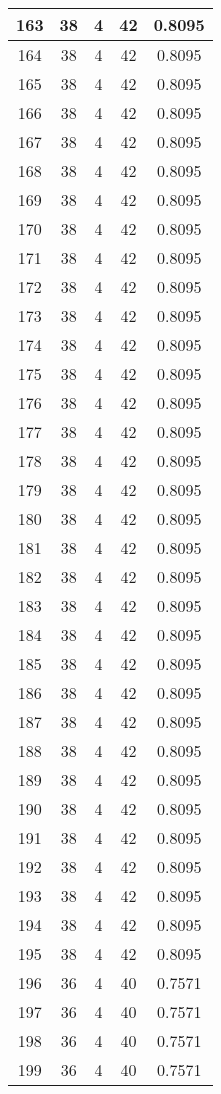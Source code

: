\documentclass[letterpaper, 12pt]{article}
\begin{document}
\begin{longtable}{|c|c|c|c|c|}
\hline
163 & 38 & 4 & 42 & 0.8095 \\
\hline
164 & 38 & 4 & 42 & 0.8095 \\
\hline
165 & 38 & 4 & 42 & 0.8095 \\
\hline
166 & 38 & 4 & 42 & 0.8095 \\
\hline
167 & 38 & 4 & 42 & 0.8095 \\
\hline
168 & 38 & 4 & 42 & 0.8095 \\
\hline
169 & 38 & 4 & 42 & 0.8095 \\
\hline
170 & 38 & 4 & 42 & 0.8095 \\
\hline
171 & 38 & 4 & 42 & 0.8095 \\
\hline
172 & 38 & 4 & 42 & 0.8095 \\
\hline
173 & 38 & 4 & 42 & 0.8095 \\
\hline
174 & 38 & 4 & 42 & 0.8095 \\
\hline
175 & 38 & 4 & 42 & 0.8095 \\
\hline
176 & 38 & 4 & 42 & 0.8095 \\
\hline
177 & 38 & 4 & 42 & 0.8095 \\
\hline
178 & 38 & 4 & 42 & 0.8095 \\
\hline
179 & 38 & 4 & 42 & 0.8095 \\
\hline
180 & 38 & 4 & 42 & 0.8095 \\
\hline
181 & 38 & 4 & 42 & 0.8095 \\
\hline
182 & 38 & 4 & 42 & 0.8095 \\
\hline
183 & 38 & 4 & 42 & 0.8095 \\
\hline
184 & 38 & 4 & 42 & 0.8095 \\
\hline
185 & 38 & 4 & 42 & 0.8095 \\
\hline
186 & 38 & 4 & 42 & 0.8095 \\
\hline
187 & 38 & 4 & 42 & 0.8095 \\
\hline
188 & 38 & 4 & 42 & 0.8095 \\
\hline
189 & 38 & 4 & 42 & 0.8095 \\
\hline
190 & 38 & 4 & 42 & 0.8095 \\
\hline
191 & 38 & 4 & 42 & 0.8095 \\
\hline
192 & 38 & 4 & 42 & 0.8095 \\
\hline
193 & 38 & 4 & 42 & 0.8095 \\
\hline
194 & 38 & 4 & 42 & 0.8095 \\
\hline
195 & 38 & 4 & 42 & 0.8095 \\
\hline
196 & 36 & 4 & 40 & 0.7571 \\
\hline
197 & 36 & 4 & 40 & 0.7571 \\
\hline
198 & 36 & 4 & 40 & 0.7571 \\
\hline
199 & 36 & 4 & 40 & 0.7571 \\
\hline
\end{longtable}
\end{document}
